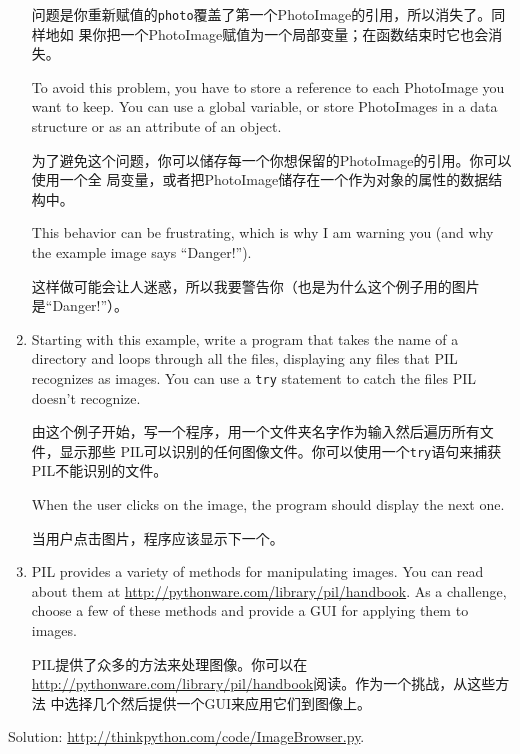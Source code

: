 \documentclass[10pt]{book}
\begin{document}
\begin{CJK}{UTF8}{gbsn}
\begin{exercise}
\begin{enumerate}
问题是你重新赋值的{\tt photo}覆盖了第一个PhotoImage的引用，所以消失了。同样地如
果你把一个PhotoImage赋值为一个局部变量；在函数结束时它也会消失。

To avoid this problem, you have to store a reference to each
PhotoImage you want to keep.  You can use a global variable, or
store PhotoImages in a data structure or as an attribute of
an object.

为了避免这个问题，你可以储存每一个你想保留的PhotoImage的引用。你可以使用一个全
局变量，或者把PhotoImage储存在一个作为对象的属性的数据结构中。

This behavior can be frustrating, which is why I am warning
you (and why the example image says ``Danger!'').

这样做可能会让人迷惑，所以我要警告你（也是为什么这个例子用的图片是``Danger!''）。

\item Starting with this example, write a program that takes
the name of a directory and loops through all the files, displaying
any files that PIL recognizes as images.  You can use a {\tt try}
statement to catch the files PIL doesn't recognize.

由这个例子开始，写一个程序，用一个文件夹名字作为输入然后遍历所有文件，显示那些
PIL可以识别的任何图像文件。你可以使用一个{\tt try}语句来捕获PIL不能识别的文件。

When the user clicks on the image, the program should display the next one.

当用户点击图片，程序应该显示下一个。

\item PIL provides a variety of methods for manipulating images.
You can read about them at \url{http://pythonware.com/library/pil/handbook}.
As a challenge, choose a few of these methods and provide a
GUI for applying them to images.

PIL提供了众多的方法来处理图像。你可以在
\url{http://pythonware.com/library/pil/handbook}阅读。作为一个挑战，从这些方法
中选择几个然后提供一个GUI来应用它们到图像上。

\end{enumerate}

Solution: \url{http://thinkpython.com/code/ImageBrowser.py}.

\end{exercise}


\begin{exercise}


\end{exercise}
\end{CJK}
\end{document}
